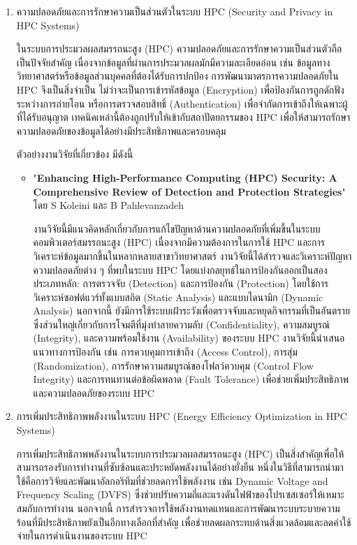 \documentclass[a4paper,12pt]{extarticle}
\begin{document}
\begin{enumerate}
	\item ความปลอดภัยและการรักษาความเป็นส่วนตัวในระบบ HPC (Security and Privacy in HPC Systems) %

	ในระบบการประมวลผลสมรรถนะสูง (HPC) ความปลอดภัยและการรักษาความเป็นส่วนตัวถือเป็นปัจจัยสำคัญ เนื่องจากข้อมูลที่ผ่านการประมวลผลมักมีความละเอียดอ่อน เช่น ข้อมูลทางวิทยาศาสตร์หรือข้อมูลส่วนบุคคลที่ต้องได้รับการปกป้อง การพัฒนามาตรการความปลอดภัยใน HPC จึงเป็นสิ่งจำเป็น ไม่ว่าจะเป็นการเข้ารหัสข้อมูล (Encryption) เพื่อป้องกันการถูกดักฟังระหว่างการถ่ายโอน หรือการตรวจสอบสิทธิ์ (Authentication) เพื่อจำกัดการเข้าถึงให้เฉพาะผู้ที่ได้รับอนุญาต เทคนิคเหล่านี้ต้องถูกปรับให้เข้ากับสถาปัตยกรรมของ HPC เพื่อให้สามารถรักษาความปลอดภัยของข้อมูลได้อย่างมีประสิทธิภาพและครอบคลุม

	ตัวอย่างงานวิจัยที่เกี่ยวข้อง มีดังนี้
	\begin{itemize}
		\item "\textbf{Enhancing High-Performance Computing (HPC) Security: A Comprehensive Review of Detection and Protection Strategies}" โดย S Koleini และ B Pahlevanzadeh

		งานวิจัยนี้มีแนวคิดหลักเกี่ยวกับการแก้ไขปัญหาด้านความปลอดภัยที่เพิ่มขึ้นในระบบคอมพิวเตอร์สมรรถนะสูง (HPC) เนื่องจากมีความต้องการในการใช้ HPC และการวิเคราะห์ข้อมูลมากขึ้นในหลากหลายสาขาวิทยาศาสตร์ งานวิจัยนี้ได้สำรวจและวิเคราะห์ปัญหาความปลอดภัยต่าง ๆ ที่พบในระบบ HPC โดยแบ่งกลยุทธ์ในการป้องกันออกเป็นสองประเภทหลัก: การตรวจจับ (Detection) และการป้องกัน (Protection) โดยใช้การวิเคราะห์ซอฟต์แวร์ทั้งแบบสถิต (Static Analysis) และแบบไดนามิก (Dynamic Analysis) นอกจากนี้ ยังมีการใช้ระบบเฝ้าระวังเพื่อตรวจจับและหยุดกิจกรรมที่เป็นอันตราย ซึ่งส่วนใหญ่เกี่ยวกับการโจมตีที่มุ่งทำลายความลับ (Confidentiality), ความสมบูรณ์ (Integrity), และความพร้อมใช้งาน (Availability) ของระบบ HPC งานวิจัยนี้นำเสนอแนวทางการป้องกัน เช่น การควบคุมการเข้าถึง (Access Control), การสุ่ม (Randomization), การรักษาความสมบูรณ์ของโฟลว์ควบคุม (Control Flow Integrity) และการทนทานต่อข้อผิดพลาด (Fault Tolerance) เพื่อช่วยเพิ่มประสิทธิภาพและความปลอดภัยของระบบ HPC
	\end{itemize}

	\item การเพิ่มประสิทธิภาพพลังงานในระบบ HPC (Energy Efficiency Optimization in HPC Systems) %

	การเพิ่มประสิทธิภาพพลังงานในระบบการประมวลผลสมรรถนะสูง (HPC) เป็นสิ่งสำคัญเพื่อให้สามารถรองรับการทำงานที่ซับซ้อนและประหยัดพลังงานได้อย่างยั่งยืน หนึ่งในวิธีที่สามารถนำมาใช้คือการวิจัยและพัฒนาอัลกอริทึมที่ช่วยลดการใช้พลังงาน เช่น Dynamic Voltage and Frequency Scaling (DVFS) ซึ่งช่วยปรับความถี่และแรงดันไฟฟ้าของโปรเซสเซอร์ให้เหมาะสมกับการทำงาน นอกจากนี้ การสำรวจการใช้พลังงานทดแทนและการพัฒนาระบบระบายความร้อนที่มีประสิทธิภาพยังเป็นอีกทางเลือกที่สำคัญ เพื่อช่วยลดผลกระทบด้านสิ่งแวดล้อมและลดค่าใช้จ่ายในการดำเนินงานของระบบ HPC


\end{enumerate}
\end{document}
